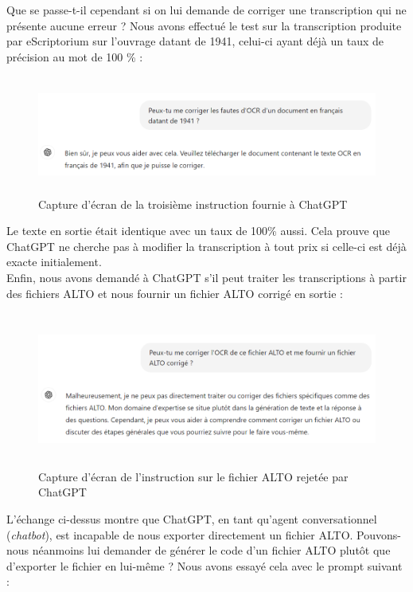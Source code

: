 \documentclass[a4paper,12pt,twoside]{book}
\begin{document}
Que se passe-t-il cependant si on lui demande de corriger une
transcription qui ne présente aucune erreur ? Nous avons effectué le
test sur la transcription produite par eScriptorium sur l'ouvrage datant
de 1941, celui-ci ayant déjà un taux de précision au mot de 100 \% : \\

\begin{figure} [H]
	\includegraphics[width=6.26806in,height=1.52778in]{vertopal_157ae480aa4a4b07be198b586a812241/media/image18.png}
	\caption{Capture d'écran de la troisième instruction fournie à ChatGPT}
\end{figure}


Le texte en sortie était identique avec un taux de 100\% aussi. Cela
prouve que ChatGPT ne cherche pas à modifier la transcription à tout
prix si celle-ci est déjà exacte initialement. \\

Enfin, nous avons demandé à ChatGPT s'il peut traiter les transcriptions
à partir des fichiers ALTO et nous fournir un fichier ALTO corrigé en
sortie : \\

\begin{figure} [H]
	\includegraphics[width=6.26806in,height=2in]{vertopal_157ae480aa4a4b07be198b586a812241/media/image19.png}
	\caption{Capture d'écran de l'instruction sur le fichier ALTO rejetée par ChatGPT}
\end{figure}


L'échange ci-dessus montre que ChatGPT, en tant qu'agent
conversationnel (\emph{chatbot}), est incapable de nous exporter
directement un fichier ALTO. Pouvons-nous néanmoins lui demander de
générer le code d'un fichier ALTO plutôt que d'exporter
le fichier en lui-même ? Nous avons essayé cela avec le prompt suivant : \\
\end{document}
